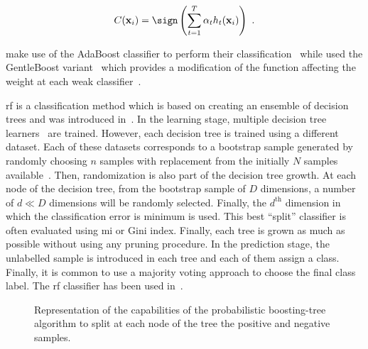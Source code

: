 \begin{equation}
	C(\mathbf{x}_i) = \sign \left( \sum_{t=1}^{T} \alpha_t h_t(\mathbf{x}_i) \right) \ .
	\label{eq:strclaada}
\end{equation}

\citeauthor{Lopes2011} make use of the AdaBoost classifier to perform their classification~\cite{Lopes2011} while \citeauthor{Litjens2014} used the GentleBoost variant~\cite{Friedman1998} which provides a modification of the function affecting the weight at each weak classifier~\cite{Litjens2014}.

\Ac{rf} is a classification method which is based on creating an ensemble of decision trees and was introduced in~\cite{Breiman2001}.
In the learning stage, multiple decision tree learners~\cite{Breiman1984} are trained.
However, each decision tree is trained using a different dataset.
Each of these datasets corresponds to a bootstrap sample generated by randomly choosing $n$ samples with replacement from the initially $N$ samples available~\cite{Efron1979}.
Then, randomization is also part of the decision tree growth.
At each node of the decision tree, from the bootstrap sample of $D$ dimensions, a number of $d \ll D$ dimensions will be randomly selected.
Finally, the $d^{\text{th}}$ dimension in which the classification error is minimum is used.
This best ``split'' classifier is often evaluated using \ac{mi} or Gini index.
Finally, each tree is grown as much as possible without using any pruning procedure.
In the prediction stage, the unlabelled sample is introduced in each tree and each of them assign a class.
Finally, it is common to use a majority voting approach to choose the final class label.
The \ac{rf} classifier has been used in~\cite{Kelm2007,Litjens2014,Tiwari2012,Tiwari2013,Viswanath2009,trigui2017automatic,trigui2016classification,samarasinghe2016semi,rampun2015classifying,rampun2016computerb,rampun2015computer,rampun2016computer}.

\begin{figure}
\centering
\caption[Representation of the probabilistic boosting-tree.]{Representation of the capabilities of the probabilistic boosting-tree algorithm to split at each node of the tree the positive and negative samples.}
\label{fig:pbtsim}
\end{figure}

